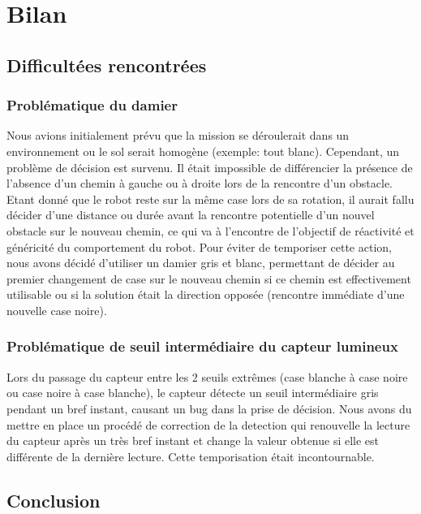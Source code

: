\section{Bilan}

\subsection{Difficultées rencontrées}

\subsubsection{Problématique du damier}

Nous avions initialement prévu que la mission se déroulerait dans un environnement ou le sol serait homogène (exemple: tout blanc). Cependant, un problème de décision est survenu. Il était impossible de différencier la présence de l'absence d'un chemin à gauche ou à droite lors de la rencontre d'un obstacle. Etant donné que le robot reste sur la même case lors de sa rotation, il aurait fallu décider d'une distance ou durée avant la rencontre potentielle d'un nouvel obstacle sur le nouveau chemin, ce qui va à l'encontre  de l'objectif de réactivité et généricité du comportement du robot. Pour éviter de temporiser cette action, nous avons décidé d'utiliser un damier gris et blanc, permettant de décider au premier changement de case sur le nouveau chemin si ce chemin est effectivement utilisable ou si la solution était la direction opposée (rencontre immédiate d'une nouvelle case noire).

\subsubsection{Problématique de seuil intermédiaire du capteur lumineux}

Lors du passage du capteur entre les 2 seuils extrêmes (case blanche à case noire ou case noire à case blanche), le capteur détecte un seuil intermédiaire gris pendant un bref instant, causant un bug dans la prise de décision. Nous avons du mettre en place un procédé de correction de la detection qui renouvelle la lecture du capteur après un très bref instant et change la valeur obtenue si elle est différente de la dernière lecture. Cette temporisation était incontournable.

\subsection{Conclusion}
